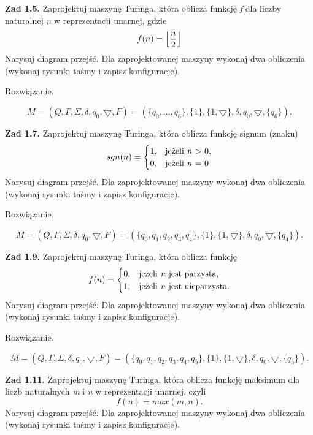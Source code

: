 \documentclass[12pt]{article}
\DeclarePairedDelimiter\floor{\lfloor}{\rfloor}
\begin{document}
\newpage

\noindent\textbf{Zad 1.5.} Zaprojektuj  maszynę  Turinga,  która  oblicza  funkcję \textit{f} dla  liczby naturalnej \textit{n} w reprezentacji unarnej, gdzie
\[f(n)=\floor*{\frac{n}{2}}\]
Narysuj diagram przejść. Dla zaprojektowanej maszyny wykonaj dwa obliczenia (wykonaj rysunki taśmy i zapisz konfiguracje).

 Rozwiązanie.

\[M=(Q,\Gamma,\Sigma,\delta,q_0,\bigtriangledown,F)=(\{q_0,...,q_6\},\{1\},\{1,\bigtriangledown\},\delta,q_0,\bigtriangledown,\{q_6\}).\]

\newpage

\noindent\textbf{Zad 1.7.} Zaprojektuj maszynę Turinga, która oblicza funkcję signum (znaku)
\[sgn(n)=
	\begin{cases}
	1, & \text{jeżeli \textit{n} > 0,} \\
	0, & \text{jeżeli \textit{n} = 0}
	\end{cases}
\]
Narysuj diagram przejść. Dla zaprojektowanej maszyny wykonaj dwa obliczenia (wykonaj rysunki taśmy i zapisz konfiguracje).

 Rozwiązanie.
 
\[M=(Q,\Gamma,\Sigma,\delta,q_0,\bigtriangledown,F)=(\{q_0,q_1,q_2,q_3,q_4\},\{1\},\{1,\bigtriangledown\},\delta,q_0,\bigtriangledown,\{q_4\}).\]

\newpage

\noindent\textbf{Zad 1.9.} Zaprojektuj maszynę Turinga, która oblicza funkcję
\[f(n)=
	\begin{cases}
	0, & \text{jeżeli \textit{n} jest parzysta,} \\
	1, & \text{jeżeli \textit{n} jest nieparzysta.}
	\end{cases}
\]
Narysuj diagram przejść. Dla zaprojektowanej maszyny wykonaj dwa obliczenia (wykonaj rysunki taśmy i zapisz konfiguracje).

 Rozwiązanie.

\[M=(Q,\Gamma,\Sigma,\delta,q_0,\bigtriangledown,F)=(\{q_0,q_1,q_2,q_3,q_4,q_5\},\{1\},\{1,\bigtriangledown\},\delta,q_0,\bigtriangledown,\{q_5\}).\]

\newpage

\noindent\textbf{Zad 1.11.} Zaprojektuj maszynę Turinga, która oblicza funkcję maksimum dla liczb naturalnych \textit{m} i \textit{n} w reprezentacji unarnej, czyli
\[f(n)=max(m,n).\]
Narysuj diagram przejść. Dla zaprojektowanej maszyny wykonaj dwa obliczenia (wykonaj rysunki taśmy i zapisz konfiguracje).
\end{document}
